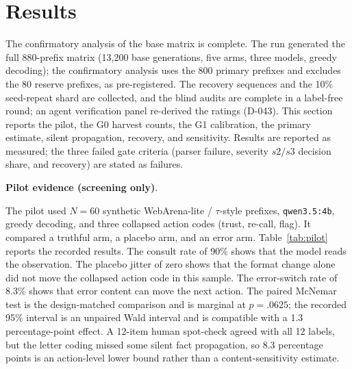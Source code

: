 \documentclass[a4paper,fleqn]{cas-sc}
\begin{document}
\section{Results}\label{sec:results}

The confirmatory analysis of the base matrix is complete. The run generated the full 880-prefix
matrix (13,200 base generations, five arms, three models, greedy decoding); the confirmatory
analysis uses the 800 primary prefixes and excludes the 80 reserve prefixes, as pre-registered.
The recovery sequences and the 10\% seed-repeat shard are collected, and the blind audits are
complete in a label-free round; an agent verification panel re-derived the ratings (D-043). This
section reports the pilot, the G0 harvest counts, the G1 calibration, the
primary estimate, silent propagation, recovery, and sensitivity. Results are reported as
measured; the three failed gate criteria (parser failure, severity $s2/s3$ decision share, and
recovery) are stated as failures.

\noindent\textbf{Pilot evidence (screening only)}.\ \label{sec:pilot}

The pilot used $N=60$ synthetic WebArena-lite / $\tau$-style prefixes, \texttt{qwen3.5:4b}, greedy
decoding, and three collapsed action codes (trust, re-call, flag). It compared a truthful arm, a
placebo arm, and an error arm. Table~\ref{tab:pilot} reports the recorded results. The consult
rate of 90\% shows that the model reads the observation. The placebo jitter of zero shows that
the format change alone did not move the collapsed action code in this sample. The error-switch
rate of 8.3\% shows that error content can move the next action. The paired McNemar test is the
design-matched comparison and is marginal at $p=.0625$; the recorded 95\% interval is an unpaired
Wald interval and is compatible with a 1.3 percentage-point effect. A 12-item human spot-check
agreed with all 12 labels, but the letter coding missed some silent fact propagation, so 8.3
percentage points is an action-level lower bound rather than a content-sensitivity estimate.
\end{document}
